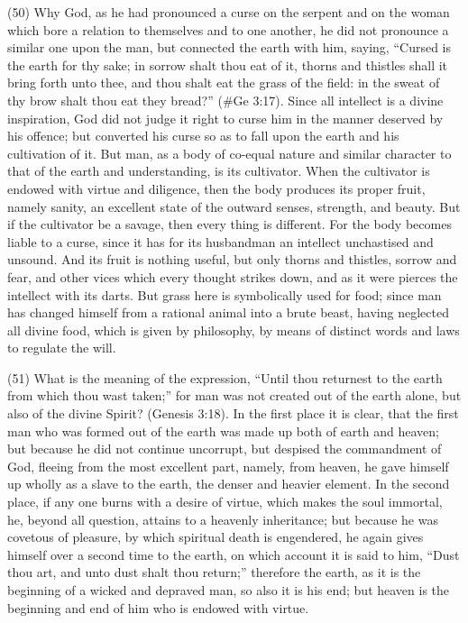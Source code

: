 (50) Why God, as he had pronounced a curse on the serpent and on the woman which bore a
relation to themselves and to one another, he did not pronounce a similar one upon the man, but
connected the earth with him, saying, ``Cursed is the earth for thy sake; in sorrow shalt thou eat of
it, thorns and thistles shall it bring forth unto thee, and thou shalt eat the grass of the field: in the
sweat of thy brow shalt thou eat they bread?'' (\#Ge 3:17). Since all intellect is a divine
inspiration, God did not judge it right to curse him in the manner deserved by his offence; but
converted his curse so as to fall upon the earth and his cultivation of it. But man, as a body of
co-equal nature and similar character to that of the earth and understanding, is its cultivator. When
the cultivator is endowed with virtue and diligence, then the body produces its proper fruit, namely
sanity, an excellent state of the outward senses, strength, and beauty. But if the cultivator be a
savage, then every thing is different. For the body becomes liable to a curse, since it has for its
husbandman an intellect unchastised and unsound. And its fruit is nothing useful, but only thorns
and thistles, sorrow and fear, and other vices which every thought strikes down, and as it were
pierces the intellect with its darts. But grass here is symbolically used for food; since man has
changed himself from a rational animal into a brute beast, having neglected all divine food, which is
given by philosophy, by means of distinct words and laws to regulate the will.

(51) What is the meaning of the expression, ``Until thou returnest to the earth from which thou wast
taken;'' for man was not created out of the earth alone, but also of the divine Spirit? (Genesis
3:18). In the first place it is clear, that the first man who was formed out of the earth was made up
both of earth and heaven; but because he did not continue uncorrupt, but despised the
commandment of God, fleeing from the most excellent part, namely, from heaven, he gave himself
up wholly as a slave to the earth, the denser and heavier element. In the second place, if any one
burns with a desire of virtue, which makes the soul immortal, he, beyond all question, attains to a
heavenly inheritance; but because he was covetous of pleasure, by which spiritual death is
engendered, he again gives himself over a second time to the earth, on which account it is said to
him, ``Dust thou art, and unto dust shalt thou return;'' therefore the earth, as it is the beginning of a
wicked and depraved man, so also it is his end; but heaven is the beginning and end of him who is
endowed with virtue.

